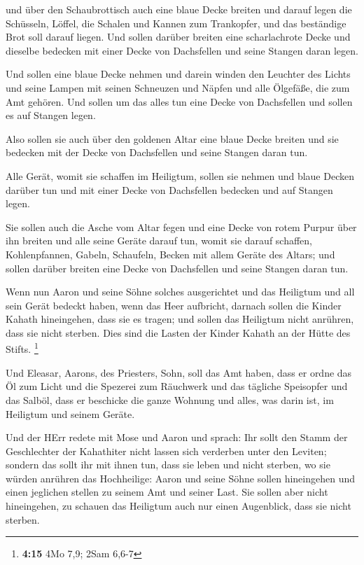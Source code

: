  und über den Schaubrottisch auch eine blaue Decke breiten
und darauf legen die Schüsseln, Löffel, die Schalen und Kannen zum
Trankopfer, und das beständige Brot soll darauf liegen. 
Und sollen darüber breiten eine scharlachrote Decke und dieselbe
bedecken mit einer Decke von Dachsfellen und seine Stangen daran legen.

 Und sollen eine blaue Decke nehmen und darein winden den
Leuchter des Lichts und seine Lampen mit seinen Schneuzen und Näpfen und
alle Ölgefäße, die zum Amt gehören.  Und sollen um das
alles tun eine Decke von Dachsfellen und sollen es auf Stangen legen.

 Also sollen sie auch über den goldenen Altar eine blaue
Decke breiten und sie bedecken mit der Decke von Dachsfellen und seine
Stangen daran tun.

 Alle Gerät, womit sie schaffen im Heiligtum, sollen sie
nehmen und blaue Decken darüber tun und mit einer Decke von Dachsfellen
bedecken und auf Stangen legen.

 Sie sollen auch die Asche vom Altar fegen und eine Decke
von rotem Purpur über ihn breiten  und alle seine Geräte
darauf tun, womit sie darauf schaffen, Kohlenpfannen, Gabeln, Schaufeln,
Becken mit allem Geräte des Altars; und sollen darüber breiten eine
Decke von Dachsfellen und seine Stangen daran tun.

 Wenn nun Aaron und seine Söhne solches ausgerichtet und
das Heiligtum und all sein Gerät bedeckt haben, wenn das Heer aufbricht,
darnach sollen die Kinder Kahath hineingehen, dass sie es tragen; und
sollen das Heiligtum nicht anrühren, dass sie nicht sterben. Dies sind
die Lasten der Kinder Kahath an der Hütte des Stifts. \footnote{\textbf{4:15}
  4Mo 7,9; 2Sam 6,6-7}

 Und Eleasar, Aarons, des Priesters, Sohn, soll das Amt
haben, dass er ordne das Öl zum Licht und die Spezerei zum Räuchwerk und
das tägliche Speisopfer und das Salböl, dass er beschicke die ganze
Wohnung und alles, was darin ist, im Heiligtum und seinem Geräte.

 Und der HErr redete mit Mose und Aaron und sprach:
 Ihr sollt den Stamm der Geschlechter der Kahathiter
nicht lassen sich verderben unter den Leviten;  sondern
das sollt ihr mit ihnen tun, dass sie leben und nicht sterben, wo sie
würden anrühren das Hochheilige: Aaron und seine Söhne sollen
hineingehen und einen jeglichen stellen zu seinem Amt und seiner Last.
 Sie sollen aber nicht hineingehen, zu schauen das
Heiligtum auch nur einen Augenblick, dass sie nicht sterben.

